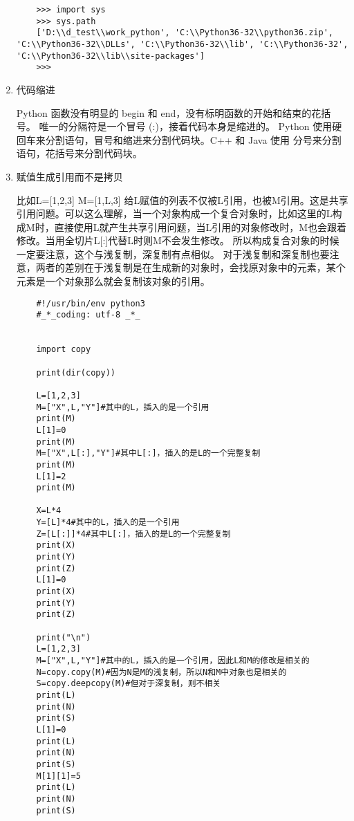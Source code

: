 \documentclass[twoside,11pt]{book}
\begin{document}
\begin{enumerate}
    \begin{lstlisting}
    >>> import sys
    >>> sys.path
    ['D:\\d_test\\work_python', 'C:\\Python36-32\\python36.zip', 'C:\\Python36-32\\DLLs', 'C:\\Python36-32\\lib', 'C:\\Python36-32', 'C:\\Python36-32\\lib\\site-packages']
    >>>
    \end{lstlisting}

  \item 代码缩进

    Python 函数没有明显的 begin 和 end，没有标明函数的开始和结束的花括号。 唯一的分隔符是一个冒号 (:)，接着代码本身是缩进的。
    Python 使用硬回车来分割语句，冒号和缩进来分割代码块。C++ 和 Java 使用
    分号来分割语句，花括号来分割代码块。

  \item 赋值生成引用而不是拷贝

    比如L=[1,2,3]
    M=[1,L,3]
    给L赋值的列表不仅被L引用，也被M引用。这是共享引用问题。可以这么理解，当一个对象构成一个复合对象时，比如这里的L构成M时，直接使用L就产生共享引用问题，当L引用的对象修改时，M也会跟着修改。当用全切片L[:]代替L时则M不会发生修改。
    所以构成复合对象的时候一定要注意，这个与浅复制，深复制有点相似。
    对于浅复制和深复制也要注意，两者的差别在于浅复制是在生成新的对象时，会找原对象中的元素，某个元素是一个对象那么就会复制该对象的引用。

    \begin{lstlisting}
    #!/usr/bin/env python3
    #_*_coding: utf-8 _*_


    import copy

    print(dir(copy))

    L=[1,2,3]
    M=["X",L,"Y"]#其中的L，插入的是一个引用
    print(M)
    L[1]=0
    print(M)
    M=["X",L[:],"Y"]#其中L[:]，插入的是L的一个完整复制
    print(M)
    L[1]=2
    print(M)

    X=L*4
    Y=[L]*4#其中的L，插入的是一个引用
    Z=[L[:]]*4#其中L[:]，插入的是L的一个完整复制
    print(X)
    print(Y)
    print(Z)
    L[1]=0
    print(X)
    print(Y)
    print(Z)

    print("\n")
    L=[1,2,3]
    M=["X",L,"Y"]#其中的L，插入的是一个引用，因此L和M的修改是相关的
    N=copy.copy(M)#因为N是M的浅复制，所以N和M中对象也是相关的
    S=copy.deepcopy(M)#但对于深复制，则不相关
    print(L)
    print(N)
    print(S)
    L[1]=0
    print(L)
    print(N)
    print(S)
    M[1][1]=5
    print(L)
    print(N)
    print(S)


\end{lstlisting}
\end{enumerate}
\end{document}
